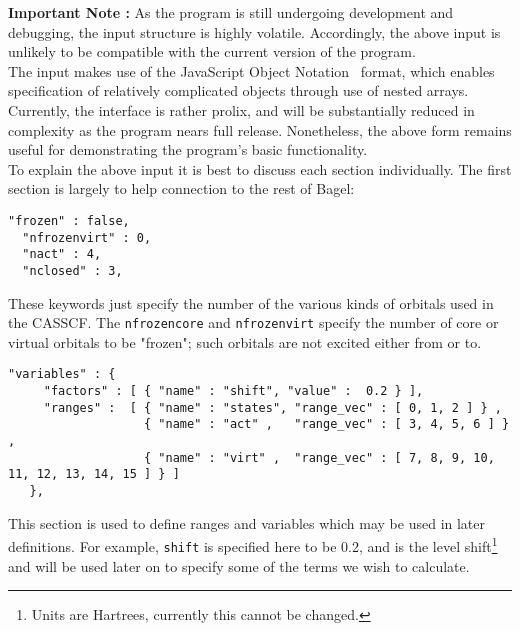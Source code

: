 \noindent \textbf{Important Note :} As the program is still undergoing development and debugging, 
the input structure is highly volatile. Accordingly, the above input is unlikely to be compatible with
the current version of the program.\\

\noindent The input makes use of the JavaScript Object Notation~\cite{JSON} format, which 
enables specification of relatively complicated objects through use of nested arrays.
Currently, the interface is rather prolix, and will be substantially reduced in complexity
as the program nears full release. Nonetheless, the above form remains useful for demonstrating the program's
basic functionality.\\

\noindent To explain the above input it is best to discuss each section individually. The 
first section is largely to help connection to the rest of Bagel:
\begin{lstlisting}[label={lst:casscf}]
  "frozen" : false,
  "nfrozenvirt" : 0,
  "nact" : 4,
  "nclosed" : 3,
\end{lstlisting}         
\noindent These keywords just specify the number of the various kinds of orbitals used in the CASSCF.
The \texttt{nfrozencore} and \texttt{nfrozenvirt} specify the number of core or virtual orbitals to be "frozen";
such orbitals are not excited either from or to.\\

\begin{lstlisting}[label={lst:variables}]
  "variables" : {
     "factors" : [ { "name" : "shift", "value" :  0.2 } ],
     "ranges" :  [ { "name" : "states", "range_vec" : [ 0, 1, 2 ] } ,
                   { "name" : "act" ,   "range_vec" : [ 3, 4, 5, 6 ] } ,
                   { "name" : "virt" ,  "range_vec" : [ 7, 8, 9, 10, 11, 12, 13, 14, 15 ] } ]
   },
\end{lstlisting}         
\noindent This section is used to define ranges and variables which may be used in later definitions. For example,
\texttt{shift} is specified here to be 0.2, and is the level shift\footnote{Units are Hartrees, currently this cannot be 
changed.} and will be used later on to specify some of the terms we wish to calculate.\\


